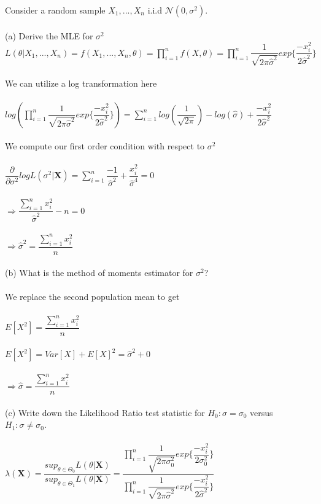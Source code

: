 \documentclass{article}
\begin{document}
Consider a random sample $X_1,...,X_n$ i.i.d $\mathcal{N}(0,\sigma^2)$.\\\\
(a) Derive the MLE for $\sigma^2$\\
$L(\theta|X_1,...,X_n)=f(X_1,...,X_n,\theta)=\prod_{i=1}^nf(X,\theta)=\prod_{i=1}^n\dfrac{1}{\sqrt{2\pi\hat{\sigma}^2}}exp\{\dfrac{-x_i^2}{2\hat{\sigma}^2}\}$\\\\
We can utilize a log transformation here\\\\
$log(\prod_{i=1}^n\dfrac{1}{\sqrt{2\pi\hat{\sigma}^2}}exp\{\dfrac{-x_i^2}{2\hat{\sigma}^2}\})=\sum_{i=1}^nlog(\dfrac{1}{\sqrt{2\pi}})-log(\hat{\sigma})+\dfrac{-x_i^2}{2\hat{\sigma}^2}$\\\\
We compute our first order condition with respect to $\sigma^2$\\\\
$\dfrac{\partial}{\partial\sigma^2}logL(\sigma^2|\textbf{X})=\sum_{i=1}^n\dfrac{-1}{\hat{\sigma}^2}+\dfrac{x_i^2}{\hat{\sigma}^4}=0$\\\\
$\Rightarrow\dfrac{\sum_{i=1}^nx_i^2}{\hat{\sigma}^2}-n=0$\\\\
$\Rightarrow\hat{\sigma}^2=\dfrac{\sum_{i=1}^nx_i^2}{n}$\\\\
(b) What is the method of moments estimator for $\sigma^2$?\\\\
We replace the second population mean to get\\\\
$E[X^2]=\dfrac{\sum_{i=1}^nx_i^2}{n}$\\\\
$E[X^2]=Var[X]+E[X]^2=\hat{\sigma}^2+0$\\\\
$\Rightarrow \hat{\sigma}=\dfrac{\sum_{i=1}^nx_i^2}{n}$\\\\
(c) Write down the Likelihood Ratio test statistic for $H_0:\sigma=\sigma_0$ versus $H_1:\sigma\neq\sigma_0$.\\\\
$\lambda(\textbf{X})=\dfrac{sup_{\theta\in\Theta_0}L(\theta|\textbf{X})}{sup_{\theta\in\Theta_1}L(\theta|\textbf{X})}=\dfrac{\prod_{i=1}^n\dfrac{1}{\sqrt{2\pi\sigma_0^2}}exp\{\dfrac{-x_i^2}{2\sigma_0^2}\}}{\prod_{i=1}^n\dfrac{1}{\sqrt{2\pi\hat{\sigma}^2}}exp\{\dfrac{-x_i^2}{2\hat{\sigma}^2}\}}$\\\\
\end{document}
